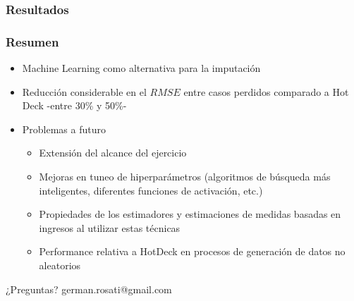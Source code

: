 \documentclass{beamer}
\begin{document}
\subsubsection{Resultados}
\begin{frame}
	\frametitle{Resumen}
	\begin{itemize}
		\item Machine Learning como alternativa para la imputación
		\item Reducción considerable en el $RMSE$ entre casos perdidos comparado a Hot Deck -entre 30\% y 50\%-
		\item Problemas a futuro
		\begin{itemize}
			\item Extensión del alcance del ejercicio
			\item Mejoras en tuneo de hiperparámetros (algoritmos de búsqueda más inteligentes, diferentes funciones de activación, etc.)
			\item Propiedades de los estimadores y estimaciones de medidas basadas en ingresos al utilizar estas técnicas
			\item Performance relativa a HotDeck en procesos de generación de datos no aleatorios
		\end{itemize}
	\end{itemize}
\end{frame}

\begin{frame}
	\begin{center}
	{\huge ¿Preguntas?
		\linebreak
		\linebreak
		\linebreak
		\linebreak}
	{\Large
		\color{blue}
		german.rosati@gmail.com
	}
	\end{center}
\end{frame}
\end{document}

